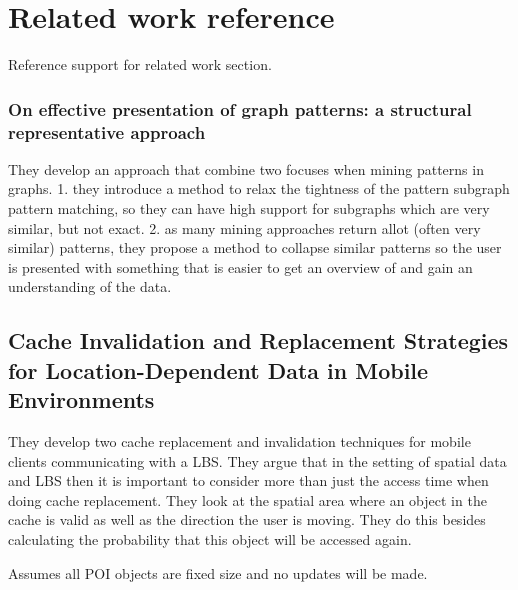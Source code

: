 \section{Related work reference}

Reference support for related work section.

\subsubsection{On effective presentation of graph patterns: a structural representative approach}
They develop an approach that combine two focuses when mining patterns in graphs. 1. they introduce a method to relax the tightness of the pattern subgraph pattern matching, so they can have high support for subgraphs which are very similar, but not exact. 2. as many mining approaches return allot (often very similar) patterns, they propose a method to collapse similar patterns so the user is presented with something that is easier to get an overview of and gain an understanding of the data. \cite{napa08}




\subsection{Cache Invalidation and Replacement Strategies for Location-Dependent Data in Mobile Environments}
They develop two cache replacement and invalidation techniques for mobile clients communicating with a LBS. They argue that in the setting of spatial data and LBS then it is important to consider more than just the access time when doing cache replacement. They look at the spatial area where an object in the cache is valid as well as the direction the user is moving. They do this besides calculating the probability that this object will be accessed again.

Assumes all POI objects are fixed size and no updates will be made. \cite{cirslddme}

